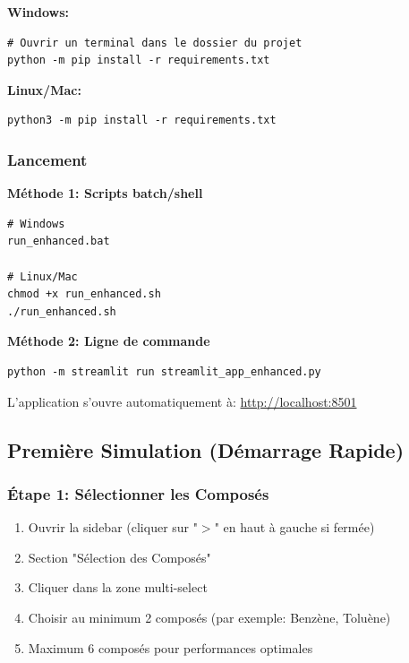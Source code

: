 \documentclass[11pt,a4paper]{article}
\begin{document}
\textbf{Windows:}

\begin{verbatim}
# Ouvrir un terminal dans le dossier du projet
python -m pip install -r requirements.txt
\end{verbatim}

\textbf{Linux/Mac:}

\begin{verbatim}
python3 -m pip install -r requirements.txt
\end{verbatim}

\subsubsection{Lancement}

\textbf{Méthode 1: Scripts batch/shell}

\begin{verbatim}
# Windows
run_enhanced.bat

# Linux/Mac
chmod +x run_enhanced.sh
./run_enhanced.sh
\end{verbatim}

\textbf{Méthode 2: Ligne de commande}

\begin{verbatim}
python -m streamlit run streamlit_app_enhanced.py
\end{verbatim}

L'application s'ouvre automatiquement à: \url{http://localhost:8501}

\subsection{Première Simulation (Démarrage Rapide)}

\subsubsection{Étape 1: Sélectionner les Composés}

\begin{enumerate}[leftmargin=*]
    \item Ouvrir la sidebar (cliquer sur "$>$" en haut à gauche si fermée)
    \item Section "Sélection des Composés"
    \item Cliquer dans la zone multi-select
    \item Choisir au minimum 2 composés (par exemple: Benzène, Toluène)
    \item Maximum 6 composés pour performances optimales
\end{enumerate}
\end{document}
